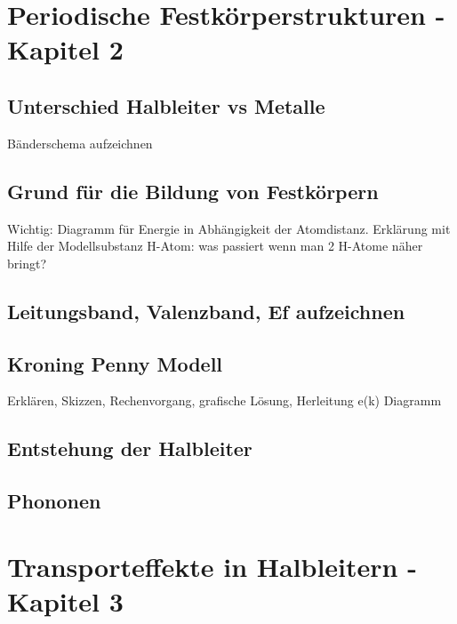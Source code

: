 \documentclass{article}
\begin{document}
\section{Periodische Festkörperstrukturen - Kapitel 2}
\subsection{Unterschied Halbleiter vs Metalle }\label{k2:metalle}
B\"anderschema aufzeichnen

\subsection{Grund für die Bildung von Festkörpern }\label{k2:festkorper}
Wichtig: Diagramm f\"ur Energie in Abh\"angigkeit der Atomdistanz. Erkl\"arung mit Hilfe der Modellsubstanz H-Atom: was passiert wenn man 2 H-Atome n\"aher bringt?

\subsection{Leitungsband, Valenzband, Ef aufzeichnen }\label{k2:leitungsBand}

\subsection{Kroning Penny Modell }\label{k2:kroningpenny}
Erkl\"aren, Skizzen, Rechenvorgang, grafische L\"osung, Herleitung e(k) Diagramm

\subsection{Entstehung der Halbleiter }\label{k2:entstehungHalbleiter}

\subsection{Phononen }\label{k2:phononen}

\section{Transporteffekte in Halbleitern - Kapitel 3}
\end{document}
